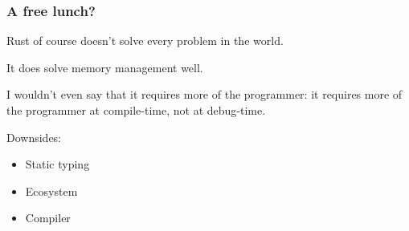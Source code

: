 \begin{frame}
\frametitle{A free lunch?}

 Rust of course doesn't solve every problem in the world. 
 
It does solve memory management well. 

I wouldn't even say that it requires more of the programmer: it requires more of the programmer at compile-time, not at debug-time.

Downsides: 

\begin{itemize}
	\item Static typing
	\item Ecosystem
	\item Compiler
\end{itemize}


\end{frame}





